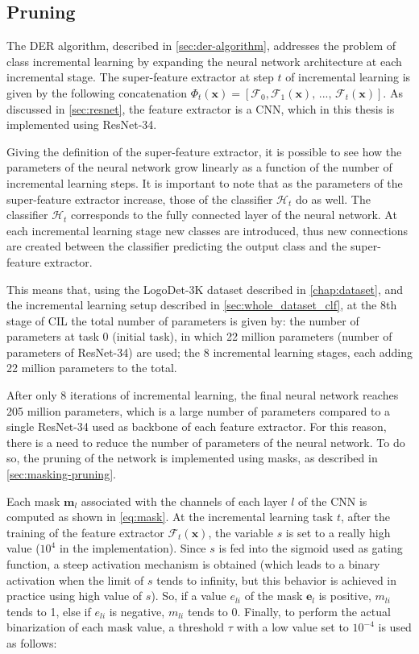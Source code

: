 \subsection{Pruning}
\label{sec:method-pruning}

The DER algorithm, described in \autoref{sec:der-algorithm}, addresses the problem of class incremental learning by expanding the neural network architecture at each incremental stage. The super-feature extractor at step $t$ of incremental learning is given by the following concatenation $\Phi_t(\mathbf{x}) = [\mathcal{F}_0,\mathcal{F}_1(\mathbf{x}), \, ..., \, \mathcal{F}_t(\mathbf{x})]$. As discussed in \autoref{sec:resnet}, the feature extractor is a CNN, which in this thesis is implemented using ResNet-34.

Giving the definition of the super-feature extractor, it is possible to see how the parameters of the neural network grow linearly as a function of the number of incremental learning steps.
It is important to note that as the parameters of the super-feature extractor increase, those of the classifier $\mathcal{H}_t$ do as well.
The classifier $\mathcal{H}_t$ corresponds to the fully connected layer of the neural network. At each incremental learning stage new classes are introduced, thus new connections are created between the classifier predicting the output class and the super-feature extractor.

This means that, using the LogoDet-3K dataset described in \autoref{chap:dataset}, and the incremental learning setup described in \autoref{sec:whole_dataset_clf}, at the 8th stage of CIL the total number of parameters is given by: the number of parameters at task 0 (initial task), in which 22 million parameters (number of parameters of ResNet-34) are used; the 8 incremental learning stages, each adding 22 million parameters to the total.

After only 8 iterations of incremental learning, the final neural network reaches 205 million parameters, which is a large number of parameters compared to a single ResNet-34 used as backbone of each feature extractor.
For this reason, there is a need to reduce the number of parameters of the neural network.
To do so, the pruning of the network is implemented using masks, as described in \autoref{sec:masking-pruning}.

Each mask $\mathbf{m}_l$ associated with the channels of each layer $l$ of the CNN is computed as shown in \autoref{eq:mask}.
At the incremental learning task $t$, after the training of the feature extractor $\mathcal{F}_t(\mathbf{x})$, the variable $s$ is set to a really high value ($10^{4}$ in the implementation).
Since $s$ is fed into the sigmoid used as gating function, a steep activation mechanism is obtained (which leads to a binary activation when the limit of $s$ tends to infinity, but this behavior is achieved in practice using high value of $s$).
So, if a value $e_{li}$ of the mask $\mathbf{e}_l$ is positive, $m_{li}$ tends to 1, else if $e_{li}$ is negative, $m_{li}$ tends to 0.
Finally, to perform the actual binarization of each mask value, a threshold $\tau$ with a low value set to $10^{-4}$ is used as follows:

